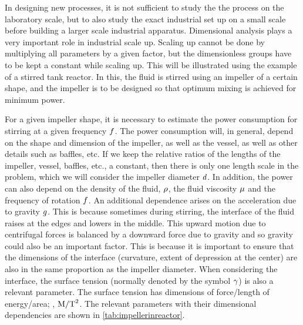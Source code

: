 \begin{example}
In designing new processes, it is not sufficient to study the the process on the laboratory scale, but to also study the exact industrial set up on a small scale before building a larger scale industrial apparatus. Dimensional analysis plays a very important role in industrial scale up. Scaling up cannot be done by multiplying all parameters by a given factor, but the dimensionless groups have to be kept a constant while scaling up. This will be illustrated using the example of a stirred tank reactor. In this, the fluid is stirred using an impeller of a certain shape, and the impeller is to be designed so that optimum mixing is achieved for minimum power.
\end{example}

\begin{solution}
For a given impeller shape, it is necessary to estimate the power consumption for stirring at a given frequency $f$. The power consumption will, in general, depend on the shape and dimension of the impeller, as well as the vessel, as well as other details such as baffles, etc. If we keep the relative ratios of the lengths of the impeller, vessel, baffles, etc., a constant, then there is only one length scale in the problem, which we will consider the impeller diameter $d$. In addition, the power can also depend on the density of the fluid, $\rho$, the fluid viscosity $\mu$ and the frequency of rotation $f$. An additional dependence arises on the acceleration due to gravity $g$. This is because sometimes during stirring, the interface of the fluid raises at the edges and lowers in the middle. This upward motion due to centrifugal forces is balanced by a downward force due to gravity and so gravity could also be an important factor. This is because it is important to ensure that the dimensions of the interface (curvature, extent of depression at the center) are also in the same proportion as the impeller diameter. When considering the interface, the surface tension (normally denoted by the symbol $\gamma$) is also a relevant parameter. The surface tension has dimensions of force/length of energy/area; \ie, $\text{M}/\text{T}^2$. The relevant parameters with their dimensional dependencies are shown in \cref{tab:impellerinreactor}.
%
%
\toprule

\end{solution}
